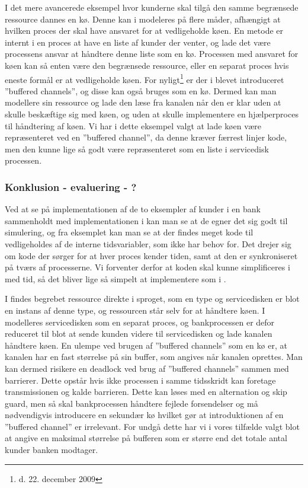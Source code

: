 I det mere avancerede eksempel hvor kunderne skal tilgå den samme begrænsede 
ressource dannes en kø. Denne kan i \pycsp modeleres på flere måder, afhængigt 
at hvilken proces der skal have ansvaret for at vedligeholde køen. En metode er 
internt i en proces at have en liste af kunder der venter, og lade det være 
processens ansvar at håndtere denne liste som en kø. Processen med ansvaret for køen kan 
så enten være den begrænsede ressource, eller en separat proces hvis eneste 
formål er at vedligeholde køen. For nyligt\footnote{d. 22. december 2009} er 
der i \pycsp blevet introduceret ''buffered channels''\cite{pycsp-r147}, og 
disse kan også bruges som en kø. Dermed kan man modellere sin ressource og lade 
den læse fra kanalen når den er klar uden at skulle beskæftige sig med køen, og 
uden at skulle implementere en hjælperproces til håndtering af køen. Vi har i 
dette eksempel valgt at lade køen være repræsenteret ved en ''buffered 
channel'', da denne  kræver færrest linjer kode, men den kunne lige så godt 
være repræsenteret som en liste i servicedisk processen.


\subsubsection*{Konklusion - evaluering - ?}
Ved at se på  implementationen af de to eksempler af kunder i en bank sammenholdt med implementationen i \simpy kan man se at de egner det sig godt til 
simulering, og fra eksemplet kan man se at der findes meget kode til 
vedligeholdes af de interne tidsvariabler, som \simpy ikke har behov for. Det drejer sig 
om kode der sørger for at hver proces kender tiden, samt at den er 
synkroniseret på tværs af processerne. Vi forventer derfor at koden skal kunne 
simplificeres i \pycsp med tid, så det bliver lige så simpelt at implementere som i 
\simpy. 

I \simpy findes begrebet ressource direkte i sproget, som en type og 
servicedisken er blot en instans af denne type, og ressourcen står selv for at 
håndtere køen. I \pycsp modelleres servicedisken som en separat proces, og 
bankprocessen er defor reduceret til blot at sende kunden videre til 
servicedisken og lade kanalen håndtere køen. En ulempe ved brugen af ''buffered 
channels'' som en kø er, at kanalen har en fast størrelse på sin buffer, som 
angives når kanalen oprettes. Man kan dermed risikere en deadlock ved brug af ''buffered 
channels'' sammen med barrierer. Dette opstår hvis ikke processen i samme 
tidsskridt kan foretage transmissionen og kalde barrieren.
Dette kan løses med en alternation og skip guard, men så 
skal bankprocessen håndtere fejlede forsendelser og må nødvendigvis introducere en 
sekundær kø hvilket gør at introduktionen af en ''buffered channel'' er 
irrelevant. For undgå dette har vi i vores tilfælde valgt blot at 
angive en maksimal størrelse på bufferen som er større end det totale antal 
kunder banken modtager.

